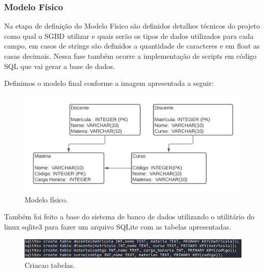 \documentclass[12pt]{article}
\begin{document}
\subsubsection{Modelo Físico}

Na etapa de definição do Modelo Físico são definidos detalhes técnicos do projeto como qual o SGBD utilizar e quais serão os tipos de dados utilizados para cada campo, em casos de strings são definidos a quantidade de caracteres e em float as casas decimais. Nessa fase também ocorre a implementação de scripts em código SQL que vai gerar a base de dados.

Definimos o modelo final conforme a imagem apresentada a seguir:

\begin{figure}[ht]
\centering
\includegraphics[width=.9\textwidth]{Modelo_Fisico.png}
\caption{Modelo físico.}
\label{fig:ModeloFisico}
\end{figure}

Também foi feito a base do sistema de banco de dados utilizando o utilitário do linux sqlite3 para fazer um arquivo SQLite com as tabelas apresentadas.

\begin{figure}[ht]
\includegraphics[width=1\textwidth]{criacao_tabelas.png}
\caption{Criacao tabelas.}
\label{fig:CriacaoTabela}
\end{figure}
\end{document}

